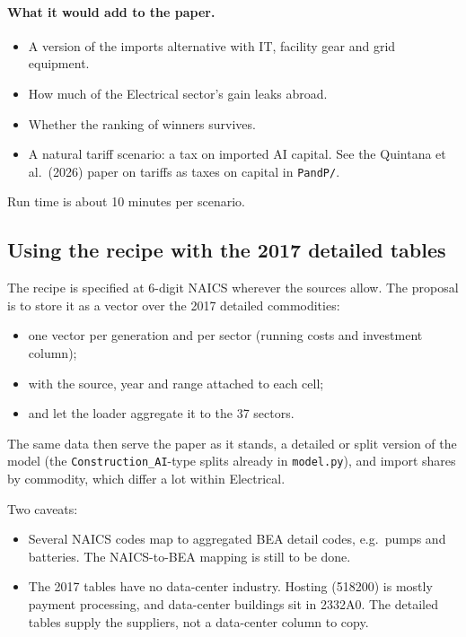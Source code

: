 \paragraph{What it would add to the paper.}
\begin{itemize}
  \item A version of the imports alternative with IT, facility gear and grid equipment.
  \item How much of the Electrical sector's gain leaks abroad.
  \item Whether the ranking of winners survives.
  \item A natural tariff scenario: a tax on imported AI capital. See the Quintana et al.\ (2026)
    paper on tariffs as taxes on capital in \texttt{PandP/}.
\end{itemize}
Run time is about 10 minutes per scenario.

\subsection{Using the recipe with the 2017 detailed tables}

The recipe is specified at 6-digit NAICS wherever the sources allow. The proposal is to store it
as a vector over the 2017 detailed commodities:
\begin{itemize}
  \item one vector per generation and per sector (running costs and investment column);
  \item with the source, year and range attached to each cell;
  \item and let the loader aggregate it to the 37 sectors.
\end{itemize}
The same data then serve the paper as it stands, a detailed or split version of the model (the
\texttt{Construction\_AI}-type splits already in \texttt{model.py}), and import shares by
commodity, which differ a lot within Electrical.

Two caveats:
\begin{itemize}
  \item Several NAICS codes map to aggregated BEA detail codes, e.g.\ pumps and batteries. The
    NAICS-to-BEA mapping is still to be done.
  \item The 2017 tables have no data-center industry. Hosting (518200) is mostly payment
    processing, and data-center buildings sit in 2332A0. The detailed tables supply the
    suppliers, not a data-center column to copy.
\end{itemize}

